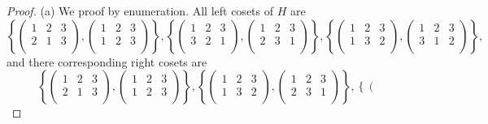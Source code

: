 \begin{proof}
(a) We proof by enumeration. All left cosets of $H$ are 
$$
\left\{ \left( \begin{matrix}
	1&		2&		3\\
	2&		1&		3\\
\end{matrix} \right) ,\left( \begin{matrix}
	1&		2&		3\\
	1&		2&		3\\
\end{matrix} \right) \right\} ,\left\{ \left( \begin{matrix}
	1&		2&		3\\
	3&		2&		1\\
\end{matrix} \right) ,\left( \begin{matrix}
	1&		2&		3\\
	2&		3&		1\\
\end{matrix} \right) \right\} ,\left\{ \left( \begin{matrix}
	1&		2&		3\\
	1&		3&		2\\
\end{matrix} \right) ,\left( \begin{matrix}
	1&		2&		3\\
	3&		1&		2\\
\end{matrix} \right) \right\} ,
$$
and there corresponding right cosets are 
$$
\left\{ \left( \begin{matrix}
	1&		2&		3\\
	2&		1&		3\\
\end{matrix} \right) ,\left( \begin{matrix}
	1&		2&		3\\
	1&		2&		3\\
\end{matrix} \right) \right\} ,\left\{ \left( \begin{matrix}
	1&		2&		3\\
	1&		3&		2\\
\end{matrix} \right) ,\left( \begin{matrix}
	1&		2&		3\\
	2&		3&		1\\
\end{matrix} \right) \right\} ,\left\{ \left( \begin{matrix}

\end{matrix}$$
\end{proof}
